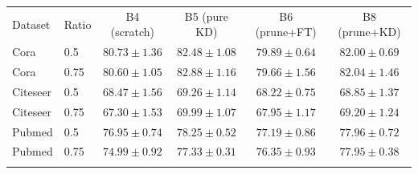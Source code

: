 \begin{table}[ht]
{\begin{tabular*}{\textwidth}{@{\extracolsep{\fill}}llcccc}
\toprule
Dataset & Ratio & B4 (scratch) & B5 (pure KD) & B6 (prune+FT) & B8 (prune+KD) \\
\colrule
Cora & 0.5  & $80.73 \pm 1.36$ & $82.48 \pm 1.08$ & $79.89 \pm 0.64$ & $82.00 \pm 0.69$ \\
Cora & 0.75 & $80.60 \pm 1.05$ & $82.88 \pm 1.16$ & $79.66 \pm 1.56$ & $82.04 \pm 1.46$ \\
\colrule
Citeseer & 0.5  & $68.47 \pm 1.56$ & $69.26 \pm 1.14$ & $68.22 \pm 0.75$ & $68.85 \pm 1.37$ \\
Citeseer & 0.75 & $67.30 \pm 1.53$ & $69.99 \pm 1.07$ & $67.95 \pm 1.17$ & $69.20 \pm 1.24$ \\
\colrule
Pubmed & 0.5  & $76.95 \pm 0.74$ & $78.25 \pm 0.52$ & $77.19 \pm 0.86$ & $77.96 \pm 0.72$ \\
Pubmed & 0.75 & $74.99 \pm 0.92$ & $77.33 \pm 0.31$ & $76.35 \pm 0.93$ & $77.95 \pm 0.38$ \\
\botrule
\end{tabular*}}
\end{table}
